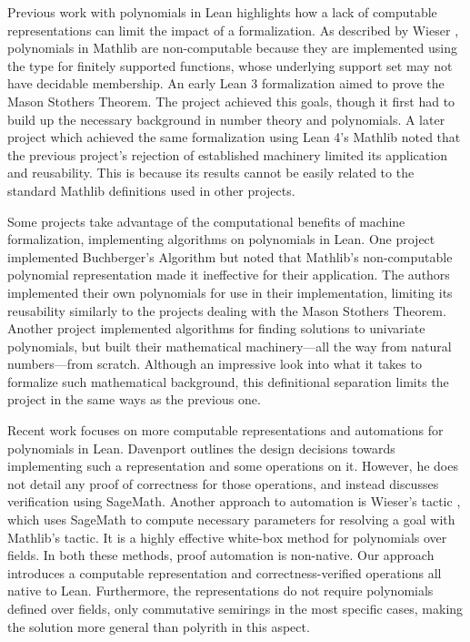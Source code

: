 
Previous work with polynomials in Lean highlights how a lack of computable representations can limit the impact of a formalization. As described by Wieser \cite{ComputationalPolynomialsFinsupps}, polynomials in Mathlib are non-computable because they are implemented using the  type for finitely supported functions, whose underlying support set may not have decidable membership. An early Lean 3 formalization \cite{MasonStothers2018} aimed to prove the Mason Stothers Theorem. The project achieved this goals, though it first had to build up the necessary background in number theory and polynomials. A later project \cite{MasonStothers2024} which achieved the same formalization using Lean 4’s Mathlib noted that the previous project’s rejection of established machinery limited its application and reusability. This is because its results cannot be easily related to the standard Mathlib definitions used in other projects.

Some projects take advantage of the computational benefits of machine formalization, implementing algorithms on polynomials in Lean. One project implemented Buchberger’s Algorithm \cite{Buchbergers2019} but noted that Mathlib’s non-computable polynomial representation made it ineffective for their application. The authors implemented their own polynomials for use in their implementation, limiting its reusability similarly to the projects dealing with the Mason Stothers Theorem. Another project \cite{UnivariateSolutions2022} implemented algorithms for finding solutions to univariate polynomials, but built their mathematical machinery---all the way from natural numbers---from scratch. Although an impressive look into what it takes to formalize such mathematical background, this definitional separation limits the project in the same ways as the previous one.

Recent work focuses on more computable representations and automations for polynomials in Lean. Davenport \cite{ComputationalPolynomials2024} outlines the design decisions towards implementing such a representation and some operations on it. However, he does not detail any proof of correctness for those operations, and instead discusses verification using SageMath. Another approach to automation is Wieser’s  tactic \cite{Polyrith}, which uses SageMath to compute necessary parameters for resolving a goal with Mathlib’s  tactic. It is a highly effective white-box method for polynomials over fields. In both these methods, proof automation is non-native. Our approach introduces a computable representation and correctness-verified operations all native to Lean. Furthermore, the representations do not require polynomials defined over fields, only commutative semirings in the most specific cases, making the solution more general than polyrith in this aspect.

